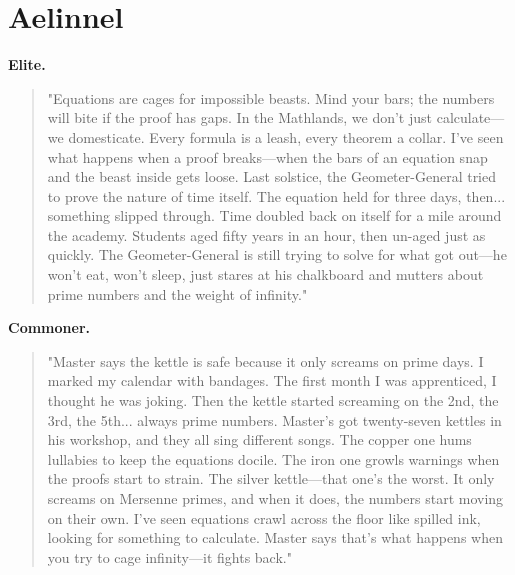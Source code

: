 \section*{Aelinnel}
\textbf{Elite.}
\begin{quote}
"Equations are cages for impossible beasts. Mind your bars; the numbers will bite if the proof has gaps. In the Mathlands, we don't just calculate—we domesticate. Every formula is a leash, every theorem a collar. I've seen what happens when a proof breaks—when the bars of an equation snap and the beast inside gets loose. Last solstice, the Geometer-General tried to prove the nature of time itself. The equation held for three days, then... something slipped through. Time doubled back on itself for a mile around the academy. Students aged fifty years in an hour, then un-aged just as quickly. The Geometer-General is still trying to solve for what got out—he won't eat, won't sleep, just stares at his chalkboard and mutters about prime numbers and the weight of infinity."
\end{quote}
\textbf{Commoner.}
\begin{quote}
"Master says the kettle is safe because it only screams on prime days. I marked my calendar with bandages. The first month I was apprenticed, I thought he was joking. Then the kettle started screaming on the 2nd, the 3rd, the 5th... always prime numbers. Master's got twenty-seven kettles in his workshop, and they all sing different songs. The copper one hums lullabies to keep the equations docile. The iron one growls warnings when the proofs start to strain. The silver kettle—that one's the worst. It only screams on Mersenne primes, and when it does, the numbers start moving on their own. I've seen equations crawl across the floor like spilled ink, looking for something to calculate. Master says that's what happens when you try to cage infinity—it fights back."
\end{quote}


